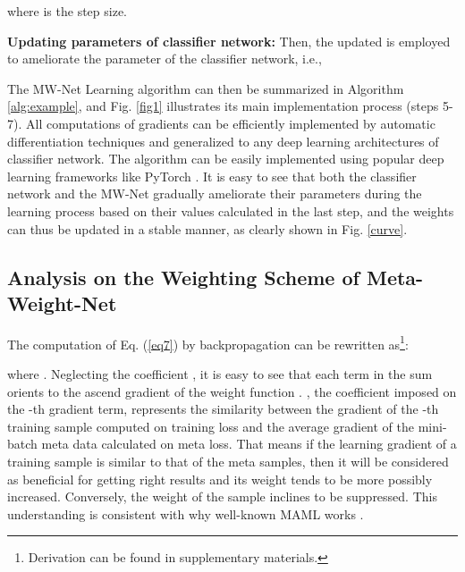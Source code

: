 \documentclass{article}
\begin{document}
	\vspace{-2mm}
	where  is the step size.\vspace{2mm}
	
	
	
	
	\textbf{Updating parameters of classifier network:} Then, the updated  is employed to ameliorate the parameter  of the classifier network, i.e., \vspace{-6mm}
	
	
	
	
	The MW-Net Learning algorithm can then be summarized in Algorithm \ref{alg:example}, and Fig. \ref{fig1} illustrates its main implementation process (steps 5-7).
	All computations of gradients can be efficiently implemented by automatic differentiation techniques and generalized to any deep learning architectures of classifier network. The algorithm can be easily implemented using popular deep learning frameworks like PyTorch \cite{paszke2017automatic}. It is easy to see that both the classifier network and the MW-Net gradually ameliorate their parameters during the learning process based on their values calculated in the last step, and the weights can thus be updated in a stable manner, as clearly shown in Fig. \ref{curve}.
	
	
	
	
	\subsection{Analysis on the Weighting Scheme of Meta-Weight-Net}
	
	The computation of Eq. (\ref{eq7}) by backpropagation can be rewritten as\footnote{Derivation can be found in supplementary materials.}:
	
	where .
	Neglecting the coefficient , it is easy to see that each term in the sum orients to the ascend gradient of the weight function . , the coefficient imposed on the -th gradient term, represents the similarity between the gradient of the -th training sample computed on training loss and the average gradient of the mini-batch meta data calculated on meta loss. That means if the learning gradient of a training sample is similar to that of the meta samples, then it will be considered as beneficial for getting right results and its weight tends to be more possibly increased. Conversely, the weight of the sample inclines to be suppressed. This understanding is consistent with why well-known MAML works \cite{finn2017model,nichol2018reptile,eshratifar2018gradient}.
	
	
\end{document}
